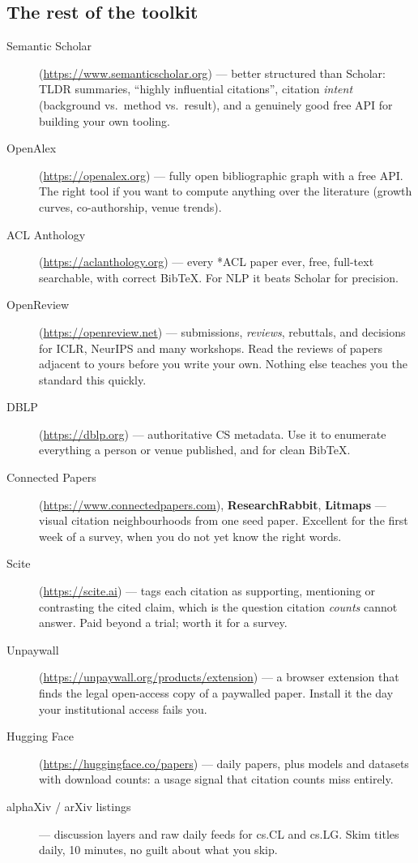 \documentclass[11pt,a4paper]{article}
\begin{document}
\subsection{The rest of the toolkit}

\begin{description}
  \item[Semantic Scholar] (\url{https://www.semanticscholar.org}) --- better
        structured than Scholar: TLDR summaries, ``highly influential
        citations'', citation \emph{intent} (background vs.\ method vs.\
        result), and a genuinely good free API for building your own tooling.
  \item[OpenAlex] (\url{https://openalex.org}) --- fully open bibliographic
        graph with a free API. The right tool if you want to compute anything
        over the literature (growth curves, co-authorship, venue trends).
  \item[ACL Anthology] (\url{https://aclanthology.org}) --- every *ACL paper
        ever, free, full-text searchable, with correct BibTeX. For NLP it
        beats Scholar for precision.
  \item[OpenReview] (\url{https://openreview.net}) --- submissions,
        \emph{reviews}, rebuttals, and decisions for ICLR, NeurIPS and many
        workshops. Read the reviews of papers adjacent to yours before you
        write your own. Nothing else teaches you the standard this quickly.
  \item[DBLP] (\url{https://dblp.org}) --- authoritative CS metadata. Use it
        to enumerate everything a person or venue published, and for clean
        BibTeX.
  \item[Connected Papers] (\url{https://www.connectedpapers.com}),
        \textbf{ResearchRabbit}, \textbf{Litmaps} --- visual citation
        neighbourhoods from one seed paper. Excellent for the first week of a
        survey, when you do not yet know the right words.
  \item[Scite] (\url{https://scite.ai}) --- tags each citation as
        supporting, mentioning or contrasting the cited claim, which is the
        question citation \emph{counts} cannot answer. Paid beyond a trial;
        worth it for a survey.
  \item[Unpaywall] (\url{https://unpaywall.org/products/extension}) --- a
        browser extension that finds the legal open-access copy of a paywalled
        paper. Install it the day your institutional access fails you.
  \item[Hugging Face] (\url{https://huggingface.co/papers}) --- daily papers,
        plus models and datasets with download counts: a usage signal that
        citation counts miss entirely.
  \item[alphaXiv / arXiv listings] --- discussion layers and raw daily feeds
        for cs.CL and cs.LG. Skim titles daily, 10 minutes, no guilt about
        what you skip.
\end{description}
\end{document}
